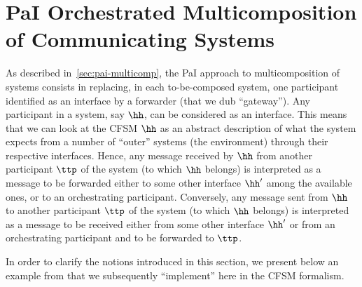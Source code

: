 \section{PaI Orchestrated Multicomposition of Communicating Systems}
\label{sec:opensys}

As described in~\cref{sec:pai-multicomp}, the PaI approach to multicomposition of systems 
consists in replacing, in each to-be-composed system, one participant 
identified as an interface by a  forwarder (that we dub ``gateway'').
Any participant in a system,  say $\hh$, can be considered as an interface.
This means that we can look  at the CFSM $\hh$  
as an
abstract description of what the system expects   
from a number of ``outer'' systems (the environment) through their respective interfaces.
Hence, any message received by $\hh$ from another participant $\ttp$ of the system (to which $\hh$ belongs)
is  interpreted as a message to be forwarded either to some other interface $\hh'$ among the available ones, or to an orchestrating participant. Conversely, any message sent from $\hh$ to another participant $\ttp$
of the system (to which $\hh$ belongs)
is  interpreted as a message to be received either from some other interface $\hh'$ or from an orchestrating participant and to be forwarded to $\ttp$.

 
 In order to clarify the notions introduced in this section, 
 we present below an example from \cite{BDGY23} that we  subsequently ``implement'' here  in the CFSM formalism.

